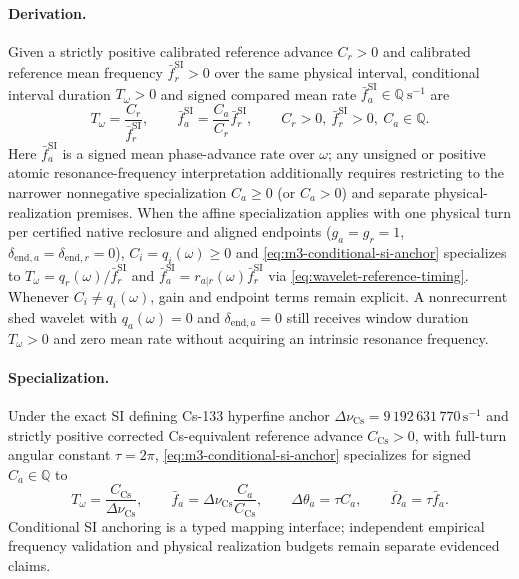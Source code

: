 \paragraph{Derivation.}
Given a strictly positive calibrated reference advance \(C_r>0\) and calibrated
reference mean frequency \(\bar f^{\mathrm{SI}}_r>0\) over the same physical
interval, conditional interval duration \(T_\omega>0\) and signed compared mean
rate \(\bar f^{\mathrm{SI}}_a\in\mathbb Q\ \mathrm{s}^{-1}\) are
\begin{equation}
 T_\omega=\frac{C_r}{\bar f^{\mathrm{SI}}_r},
 \qquad
 \bar f^{\mathrm{SI}}_a=\frac{C_a}{C_r}\bar f^{\mathrm{SI}}_r,
 \qquad C_r>0,\ \bar f^{\mathrm{SI}}_r>0,\ C_a\in\mathbb Q.
 \label{eq:m3-conditional-si-anchor}
\end{equation}
Here \(\bar f^{\mathrm{SI}}_a\) is a signed mean phase-advance rate over
\(\omega\); any unsigned or positive atomic resonance-frequency interpretation
additionally requires restricting to the narrower nonnegative specialization
\(C_a\ge 0\) (or \(C_a>0\)) and separate physical-realization premises. When
the affine specialization applies with one physical turn per certified native
reclosure and aligned endpoints (\(g_a=g_r=1\),
\(\delta_{\mathrm{end},a}=\delta_{\mathrm{end},r}=0\)), \(C_i=q_i(\omega)\ge 0\)
and \eqref{eq:m3-conditional-si-anchor} specializes to
\(T_\omega=q_r(\omega)/\bar f^{\mathrm{SI}}_r\) and
\(\bar f^{\mathrm{SI}}_a=r_{a|r}(\omega)\bar f^{\mathrm{SI}}_r\) via
\eqref{eq:wavelet-reference-timing}. Whenever \(C_i\ne q_i(\omega)\), gain and
endpoint terms remain explicit. A nonrecurrent shed wavelet with
\(q_a(\omega)=0\) and \(\delta_{\mathrm{end},a}=0\) still receives window
duration \(T_\omega>0\) and zero mean rate without acquiring an intrinsic
resonance frequency.

\paragraph{Specialization.}
Under the exact SI defining Cs-133 hyperfine anchor
\(\Delta\nu_{\mathrm{Cs}}=9\,192\,631\,770\,\mathrm{s}^{-1}\) and strictly
positive corrected Cs-equivalent reference advance \(C_{\mathrm{Cs}}>0\), with
full-turn angular constant \(\tau=2\pi\), \eqref{eq:m3-conditional-si-anchor}
specializes for signed \(C_a\in\mathbb Q\) to
\begin{equation}
 T_\omega=\frac{C_{\mathrm{Cs}}}{\Delta\nu_{\mathrm{Cs}}},
 \qquad
 \bar f_a=\Delta\nu_{\mathrm{Cs}}\frac{C_a}{C_{\mathrm{Cs}}},
 \qquad
 \Delta\theta_a=\tau C_a,
 \qquad
 \bar\Omega_a=\tau\bar f_a.
 \label{eq:m3-cs133-tau-interface}
\end{equation}
Conditional SI anchoring is a typed mapping interface; independent empirical
frequency validation and physical realization budgets remain separate
evidenced claims.

